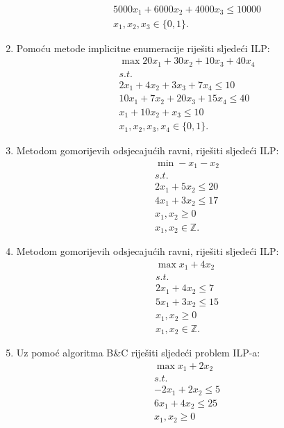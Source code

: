 \documentclass[a4paper, utf8, 11pt, colorlinks]{book}
\begin{document}
\begin{enumerate}
\begin{align*}
  & 5000 x_1 + 6000 x_2 + 4000 x_3 \leq 10000 \\
  & x_1, x_2, x_3 \in \{0, 1\}.
\end{align*}
\item  Pomoću metode implicitne enumeracije riješiti sljedeći ILP:
\begin{align*}
	 &\max 20 x_1 + 30 x_2 + 10 x_3 + 40 x_4 \\
	 &s.t. \\
	 & 2x_1 + 4 x_2 + 3 x_3 + 7 x_4 \leq 10 \\
	 & 10 x_1 + 7 x_2 + 20 x_3 + 15 x_4 \leq 40 \\
	 & x_1 + 10 x_2 + x_3 \leq 10 \\
	 & x_1, x_2, x_3, x_4 \in \{0, 1\}.
\end{align*}
	\item Metodom gomorijevih odsjecajućih ravni, riješiti sljedeći ILP:%
	\begin{align*}
		 &\min -x_1 - x_2 \\
		 &s.t.\\
		 & 2 x_1 + 5x_2 \leq 20 \\
		 & 4 x_1 + 3 x_2 \leq 17 \\
		 & x_1, x_2 \geq 0 \\
		 & x_1, x_2 \in \mathbb{Z}.
	\end{align*}
\item Metodom gomorijevih odsjecajućih ravni, riješiti sljedeći ILP:%
\begin{align*}
	& \max x_1 + 4 x_2 \\
	& s.t. \\
	& 2 x_1 + 4 x_2 \leq 7 \\
	& 5 x_1 + 3 x_2 \leq 15 \\
	& x_1, x_2 \geq 0 \\
	& x_1, x_2 \in \mathbb{Z}.
	\end{align*}
\item    %
  Uz pomoć algoritma B\&C riješiti sljedeći problem ILP-a:
  \begin{align*}
  	 &\max x_1 + 2 x_2 \\
  	 &s.t. \\
  	 & -2x_1 + 2 x_2 \leq 5 \\
  	 & 6 x_1 + 4 x_2 \leq 25 \\
  	 & x_1, x_2 \geq 0 \\

\end{align*}
\end{enumerate}
\end{document}
